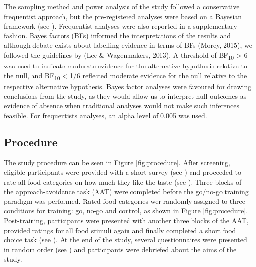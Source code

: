 \documentclass[man,floatsintext]{apa6}
\begin{document}
The sampling method and power analysis of the study followed a conservative frequentist approach, but the pre-registered analyses were based on a Bayesian framework (see \textit{}). Frequentist analyses were also reported in a supplementary fashion. Bayes factors (BFs) informed the interpretations of the results and although debate exists about labelling evidence in terms of BFs (Morey, 2015), we followed the guidelines by (Lee \& Wagenmakers, 2013). A threshold of BF\textsubscript{10} \textgreater{} 6 was used to indicate moderate evidence for the alternative hypothesis relative to the null, and BF\textsubscript{10} \textless{} 1/6 reflected moderate evidence for the null relative to the respective alternative hypothesis. Bayes factor analyses were favoured for drawing conclusions from the study, as they would allow us to interpret null outcomes as evidence of absence when traditional analyses would not make such inferences feasible. For frequentists analyses, an alpha level of 0.005 was used.

\hypertarget{procedure}{%
\subsection{Procedure}\label{procedure}}

The study procedure can be seen in Figure \ref{fig:procedure}. After screening, eligible participants were provided with a short survey (see \textit{}) and proceeded to rate all food categories on how much they like the taste (see \textit{}). Three blocks of the approach-avoidance task (AAT) were completed before the go/no-go training paradigm was performed. Rated food categories wer randomly assigned to three conditions for training: go, no-go and control, as shown in Figure \ref{fig:procedure}. Post-training, participants were presented with another three blocks of the AAT, provided ratings for all food stimuli again and finally completed a short food choice task (see \textit{}). At the end of the study, several questionnaires were presented in random order (see \textit{}) and participants were debriefed about the aims of the study.
\end{document}
